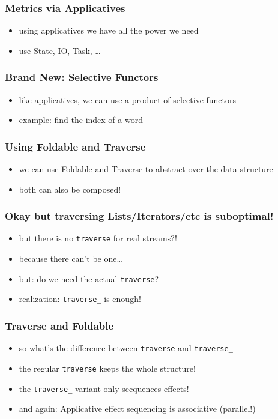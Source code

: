 \documentclass[aspectratio=169]{beamer}
\begin{document}
\begin{frame}
  \frametitle{Metrics via Applicatives}
  \begin{itemize}
  \item using applicatives we have all the power we need
  \item use State, IO, Task, \ldots
  \end{itemize}
\end{frame}

\begin{frame}
  \frametitle{Brand New: Selective Functors}
  \begin{itemize}
  \item like applicatives, we can use a product of selective functors
  \item example: find the index of a word
  \end{itemize}
\end{frame}

\begin{frame}
  \frametitle{Using Foldable and Traverse}
  \begin{itemize}
  \item we can use Foldable and Traverse to abstract over the data structure
  \item both can also be composed!
  \end{itemize}
\end{frame}

\begin{frame}
  \frametitle{Okay but traversing Lists/Iterators/etc is suboptimal!}
  \begin{itemize}
  \item but there is no \texttt{traverse} for real streams?!
  \item because there can't be one\ldots
  \item but: do we need the actual \texttt{traverse}?
  \item realization: \texttt{traverse\_} is enough!
  \end{itemize}
\end{frame}

\begin{frame}
  \frametitle{Traverse and Foldable}
  \begin{itemize}
  \item so what's the difference between \texttt{traverse} and \texttt{traverse\_}
  \item the regular \texttt{traverse} keeps the whole structure!
  \item the \texttt{traverse\_} variant only secquences effects!
  \item and again: Applicative effect sequencing is associative (parallel!)
  \end{itemize}
\end{frame}
\end{document}
